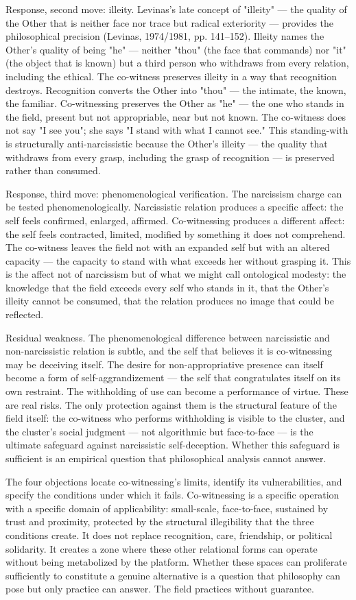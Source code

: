 Response, second move: illeity. Levinas's late concept of "illeity" — the quality of the Other that is neither face nor trace but radical exteriority — provides the philosophical precision (Levinas, 1974/1981, pp. 141–152). Illeity names the Other's quality of being "he" — neither "thou" (the face that commands) nor "it" (the object that is known) but a third person who withdraws from every relation, including the ethical. The co-witness preserves illeity in a way that recognition destroys. Recognition converts the Other into "thou" — the intimate, the known, the familiar. Co-witnessing preserves the Other as "he" — the one who stands in the field, present but not appropriable, near but not known. The co-witness does not say "I see you"; she says "I stand with what I cannot see." This standing-with is structurally anti-narcissistic because the Other's illeity — the quality that withdraws from every grasp, including the grasp of recognition — is preserved rather than consumed.

Response, third move: phenomenological verification. The narcissism charge can be tested phenomenologically. Narcissistic relation produces a specific affect: the self feels confirmed, enlarged, affirmed. Co-witnessing produces a different affect: the self feels contracted, limited, modified by something it does not comprehend. The co-witness leaves the field not with an expanded self but with an altered capacity — the capacity to stand with what exceeds her without grasping it. This is the affect not of narcissism but of what we might call ontological modesty: the knowledge that the field exceeds every self who stands in it, that the Other's illeity cannot be consumed, that the relation produces no image that could be reflected.

Residual weakness. The phenomenological difference between narcissistic and non-narcissistic relation is subtle, and the self that believes it is co-witnessing may be deceiving itself. The desire for non-appropriative presence can itself become a form of self-aggrandizement — the self that congratulates itself on its own restraint. The withholding of use can become a performance of virtue. These are real risks. The only protection against them is the structural feature of the field itself: the co-witness who performs withholding is visible to the cluster, and the cluster's social judgment — not algorithmic but face-to-face — is the ultimate safeguard against narcissistic self-deception. Whether this safeguard is sufficient is an empirical question that philosophical analysis cannot answer.

The four objections locate co-witnessing's limits, identify its vulnerabilities, and specify the conditions under which it fails. Co-witnessing is a specific operation with a specific domain of applicability: small-scale, face-to-face, sustained by trust and proximity, protected by the structural illegibility that the three conditions create. It does not replace recognition, care, friendship, or political solidarity. It creates a zone where these other relational forms can operate without being metabolized by the platform. Whether these spaces can proliferate sufficiently to constitute a genuine alternative is a question that philosophy can pose but only practice can answer. The field practices without guarantee.